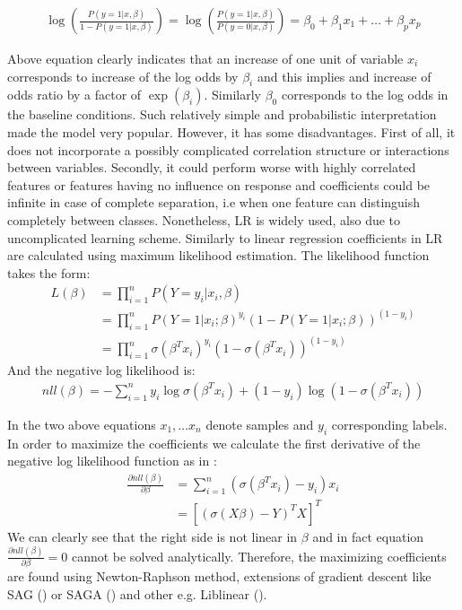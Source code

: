 \documentclass[12pt, wide]{mwart}
\begin{document}
\begin{align*}
    \log \left(\frac{P(y=1| x, \beta)}{1-P(y=1| x, \beta)}\right)=\log \left(\frac{P(y=1| x, \beta)}{P(y=0| x, \beta)}\right)=\beta_{0}+\beta_{1} x_{1}+\ldots+\beta_{p} x_{p}
\end{align*}

Above equation clearly indicates that an increase of one unit of variable $x_i$ corresponds to increase of the log odds by $\beta_i$ and this implies and increase of odds ratio by a factor of $\exp(\beta_i)$. Similarly $\beta_0$ corresponds to the log odds in the baseline conditions. Such relatively simple and probabilistic interpretation made the model very popular. However, it has some disadvantages. First of all, it does not incorporate a possibly complicated correlation structure or interactions between variables. Secondly, it could perform worse with highly correlated features or features having no influence on response and coefficients could be infinite in case of complete separation, i.e when one feature can distinguish completely between classes. Nonetheless, LR is widely used, also due to uncomplicated learning scheme. Similarly to linear regression coefficients in LR are calculated using maximum likelihood estimation. The likelihood function takes the form:
\begin{align*}
    L(\beta) &= \prod_{i=1}^n P(Y=y_i | x_i, \beta) \\&= \prod_{i=1}^n P(Y=1 | x_i ; \beta)^{y_i}(1-P(Y=1 | x_i ; \beta))^{\left(1-y_i\right)} \\
&= \prod_{i=1}^n \sigma\left(\beta^{T} x_i\right)^{y_i}\left(1-\sigma\left(\beta^{T} x_i\right)\right)^{\left(1-y_i\right)}
\end{align*}
And the negative log likelihood is:
\begin{align*}
    nll(\beta)=-\sum_{i=1}^{n} y_i \log \sigma\left(\beta^{T} x_i\right)+\left(1-y_i\right) \log \left(1-\sigma\left(\beta^{T} x_i\right)\right)
\end{align*}

In the two above equations $x_1, \ldots x_n$ denote samples and $y_i$ corresponding labels. In order to maximize the coefficients we calculate the first derivative of the negative log likelihood function as in \cite[chapter 4.4.1]{ESL2}:
\begin{align*}
    \frac{\partial nll(\beta)}{\partial \beta}&=\sum_{i=1}^{n}\left(\sigma\left(\beta^{T} x_i\right)-y_i\right) x_i\\ &=
    \left[\left(\sigma(X\beta) - Y\right)^TX\right]^T
\end{align*}
We can clearly see that the right side is not linear in $\beta$ and in fact equation $\frac{\partial nll(\beta)}{\partial \beta} = 0$ cannot be solved analytically. Therefore, the maximizing coefficients are found using Newton-Raphson method, extensions of gradient descent like SAG (\cite{sag}) or SAGA (\cite{saga}) and other e.g. Liblinear (\cite{liblinear}). 
\end{document}
